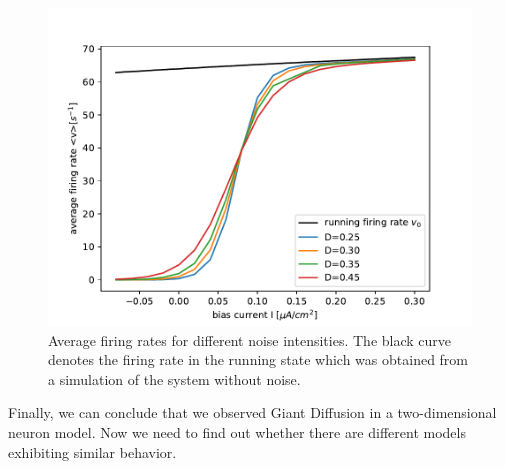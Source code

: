 \documentclass[12pt,a4paper]{article}
\begin{document}
\begin{figure}[H]
	\centering
	\includegraphics[scale=1]{gneur23critrealfast16alcoarsewstfrealfast9acoarsetf.pdf}\caption{Average firing rates for different noise intensities. The black curve denotes the firing rate in the running state which was obtained from a simulation of the system without noise.}
	\label{rate}
\end{figure}
Finally, we can conclude that we observed Giant Diffusion in a two-dimensional neuron model. Now we need to find out whether there are different models exhibiting similar behavior.
\end{document}
